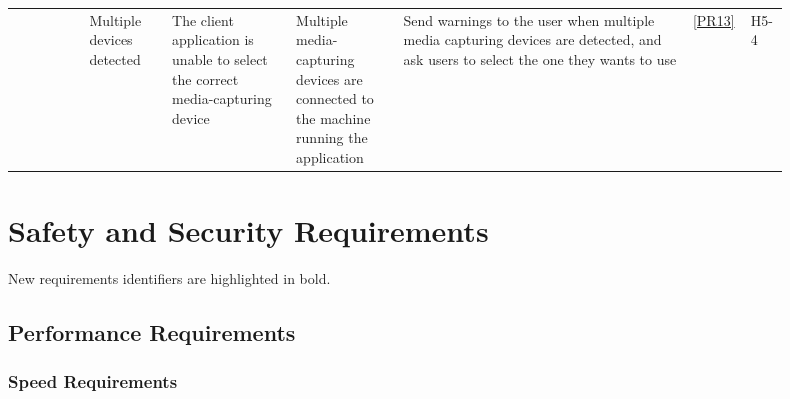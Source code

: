 \documentclass{article}
\begin{document}
\begin{landscape}
\begin{table}
\begin{tabular}[h]{L{0.09\linewidth}L{0.1\linewidth}L{0.15\linewidth}L{0.13\linewidth}L{0.35\linewidth}L{0.04\linewidth}L{0.04\linewidth}}
      & Multiple devices detected
      & The client application is unable to select the correct media-capturing device
      & Multiple media-capturing devices are connected to the machine running the application
      & Send warnings to the user when multiple media capturing devices are detected, and ask users to select the one they wants to use
      & \ref{PR13}
      & H5-4\\

    \end{tabular}
  \end{table}
\end{landscape}
\restoregeometry

\section{Safety and Security Requirements}

New requirements identifiers are highlighted in bold.

\subsection{Performance Requirements}

\subsubsection{Speed Requirements}
\end{document}
